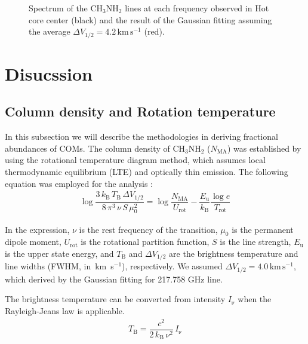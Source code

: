 \begin{figure}[H]
\begin{center}
\label{fig:spec}
\caption{Spectrum of the CH$_3$NH$_2$ lines at each frequency observed in Hot core center (black) 
 and the result of the Gaussian fitting assuming the average $\Delta V_{1/2} = 4.2\, \mathrm{km\,s^{-1}}$ (red).}
\end{center}
\end{figure}


\section{Disucssion}
\subsection{Column density and Rotation temperature}

In this subsection we will describe the methodologies in deriving fractional abundances of COMs.
The column density of CH$_{3}$NH$_{2}$ ($N_{\mathrm{MA}}$) was established by using 
the rotational temperature diagram method, which assumes local thermodynamic equilibrium 
(LTE) and optically thin emission. 
The following equation was employed for the analysis \citep{Turner1991}:
\begin{align}
\log \dfrac{3\,k_{\mathrm{B}}\,T_{\mathrm{B}} \,\Delta V_{1/2}}{8\, \pi^3\, \nu\, S\, \mu_0^2} = \log \dfrac{N_{\mathrm{MA}}}{U_{\mathrm{rot}}} - \dfrac{E_{\mathrm{u}}}{k_{\mathrm{B}}} \dfrac{\log e}{T_{\mathrm{rot}}}
\label{eq:RD}
\end{align}

In the expression, $\nu$ is the rest frequency of the transition, $\mu_0$ is the permanent dipole moment, 
$U_{\mathrm{rot}}$ is the rotational partition function, $S$ is the line strength, 
$E_{\mathrm{u}}$ is the upper state energy, and $ T_{\mathrm{B}}$ and  $\Delta V_{1/2}$ 
are the brightness temperature and line widths (FWHM, in~km~s$^{-1}$), respectively.
We assumed $\Delta V_{1/2} = 4.0\, \mathrm{km\,s^{-1}}$, which derived by the Gaussian fitting for 
217.758 GHz line.

The brightness temperature can be converted from intensity $I_{\mathrm{\nu}}$
when the Rayleigh-Jeans law is applicable.
\begin{align}
T_{\mathrm{B}} = \dfrac{c^2}{2\,k_{\mathrm{B}}\, \nu^2} \,I_{\mathrm{\nu}}
\end{align}

